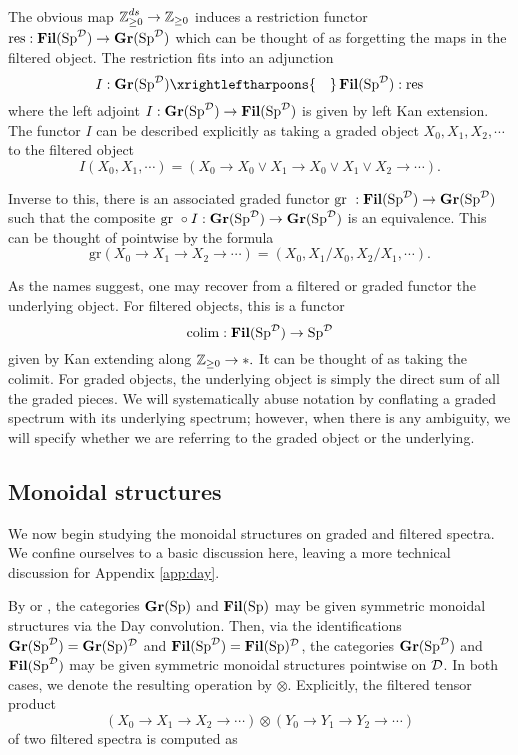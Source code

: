 The obvious map $\Z_{\geq 0}^{ds} \to \Z_{\geq 0}$ induces a restriction functor $\text{res}: \Fil(\Sp^{\D}) \to \Gr(\Sp^{\D})$ which can be thought of as forgetting the maps in the filtered object.  The restriction fits into an adjunction  
$$I:\Gr(\Sp^{\D}) \xrightleftharpoons{\quad} \Fil(\Sp^{\D}) : \text{res}$$
where the left adjoint $I: \Gr(\Sp^{\D}) \to \Fil(\Sp^{\D})$ is given by left Kan extension.  The functor $I$ can be described explicitly as taking a graded object $X_0,X_1,X_2,\cdots$ to the filtered object $$I(X_0, X_1, \cdots) = (X_0\to X_0 \vee X_1\to X_0 \vee X_1 \vee X_2\to \cdots).$$   

Inverse to this, there is an associated graded functor $\text{gr }: \Fil(\Sp^{\D}) \to \Gr(\Sp^{\D})$ such that the composite $\text{gr }\circ I : \Gr(\Sp^{\D}) \to \Gr(\Sp^{\D})$ is an equivalence.   This can be thought of pointwise by the formula $$\text{gr}(X_0\to X_1\to X_2\to \cdots) = (X_0, X_1/X_0, X_2/X_1, \cdots).$$

As the names suggest, one may recover from a filtered or graded functor the underlying object.  For filtered objects, this is a functor $$\colim : \Fil(\Sp^{\D}) \to \Sp^{\D}$$ given by Kan extending along $\Z_{\geq 0}\to *.$   It can be thought of as taking the colimit.  For graded objects, the underlying object is simply the direct sum of all the graded pieces. We will systematically abuse notation by conflating a graded spectrum with its underlying spectrum; however, when there is any ambiguity, we will specify whether we are referring to the graded object or the underlying.




\subsection{Monoidal structures}\label{sect:monoidal}
We now begin studying the monoidal structures on graded and filtered spectra.  We confine ourselves to a basic discussion here, leaving a more technical discussion for Appendix \ref{app:day}.

By \cite{Glasman} or \cite[Example 2.2.6.17]{HA}, the categories $\Gr(\Sp)$ and $\Fil(\Sp)$ may be given symmetric monoidal structures via the Day convolution.  Then, via the identifications $\Gr(\Sp^{\D}) = \Gr(\Sp)^{\D}$ and $\Fil(\Sp^{\D}) = \Fil(\Sp)^{\D}$, the categories $\Gr(\Sp^{\D})$ and $\Fil(\Sp^{\D})$ may be given symmetric monoidal structures pointwise on $\D$.  In both cases, we denote the resulting operation by $\otimes$. Explicitly, the filtered tensor product $$\left(X_0 \longrightarrow X_1 \longrightarrow X_2 \longrightarrow \cdots \right) \otimes \left(Y_0 \longrightarrow Y_1 \longrightarrow Y_2 \longrightarrow \cdots \right)$$
of two filtered spectra is computed as

